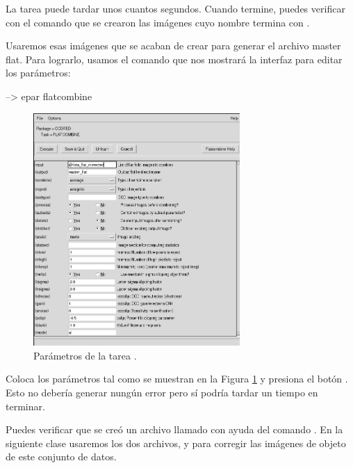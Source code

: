 La tarea puede tardar unos cuantos segundos. Cuando termine, puedes verificar con el comando  que se crearon las imágenes cuyo nombre termina con . 

Usaremos esas imágenes que se acaban de crear para generar el archivo master flat. Para lograrlo, usamos el comando  que nos mostrará la interfaz para editar los parámetros:

\begin{shell}
--> epar flatcombine

\end{shell}

\begin{figure}[htb]
  \centering
	\includegraphics[width=0.7\textwidth]{figures/pyraf-flatcombine.png}
	\caption{Parámetros de la tarea .}
	\label{fig:pyraf-flatcombine} 
\end{figure}

Coloca los parámetros tal como se muestran en la Figura \ref{fig:pyraf-flatcombine} y presiona el botón . Esto no debería generar nungún error pero sí podría tardar un tiempo en terminar. 

Puedes verificar que se creó un archivo llamado  con ayuda del comando . En la siguiente clase usaremos los dos archivos,  y  para corregir las imágenes de objeto de este conjunto de datos. 

